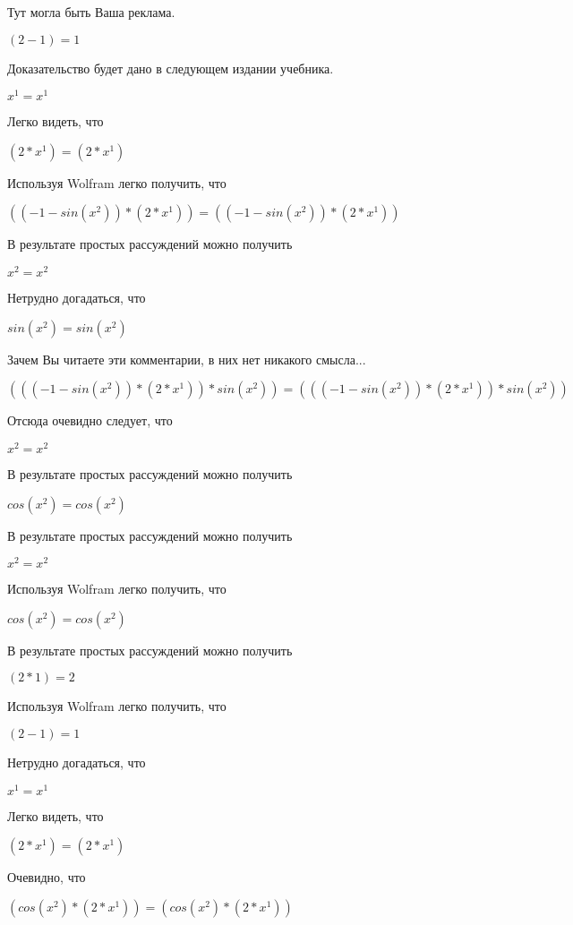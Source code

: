 \documentclass[12pt,a4paper,fleqn]{article}
\theoremstyle{definition}
\begin{document}
Тут могла быть Ваша реклама.

$( 2  -  1 ) =  1 $

Доказательство будет дано в следующем издании учебника.

${ x }^{ 1 } = { x }^{ 1 }$

Легко видеть, что

$( 2  * { x }^{ 1 }) = ( 2  * { x }^{ 1 })$

Используя Wolfram легко получить, что

$(( -1  - sin({ x }^{ 2 })) * ( 2  * { x }^{ 1 })) = (( -1  - sin({ x }^{ 2 })) * ( 2  * { x }^{ 1 }))$

В результате простых рассуждений можно получить

${ x }^{ 2 } = { x }^{ 2 }$

Нетрудно догадаться, что

$sin({ x }^{ 2 }) = sin({ x }^{ 2 })$

Зачем Вы читаете эти комментарии, в них нет никакого смысла...

$((( -1  - sin({ x }^{ 2 })) * ( 2  * { x }^{ 1 })) * sin({ x }^{ 2 })) = ((( -1  - sin({ x }^{ 2 })) * ( 2  * { x }^{ 1 })) * sin({ x }^{ 2 }))$

Отсюда очевидно следует, что

${ x }^{ 2 } = { x }^{ 2 }$

В результате простых рассуждений можно получить

$cos({ x }^{ 2 }) = cos({ x }^{ 2 })$

В результате простых рассуждений можно получить

${ x }^{ 2 } = { x }^{ 2 }$

Используя Wolfram легко получить, что

$cos({ x }^{ 2 }) = cos({ x }^{ 2 })$

В результате простых рассуждений можно получить

$( 2  *  1 ) =  2 $

Используя Wolfram легко получить, что

$( 2  -  1 ) =  1 $

Нетрудно догадаться, что

${ x }^{ 1 } = { x }^{ 1 }$

Легко видеть, что

$( 2  * { x }^{ 1 }) = ( 2  * { x }^{ 1 })$

Очевидно, что

$(cos({ x }^{ 2 }) * ( 2  * { x }^{ 1 })) = (cos({ x }^{ 2 }) * ( 2  * { x }^{ 1 }))$
\end{document}
